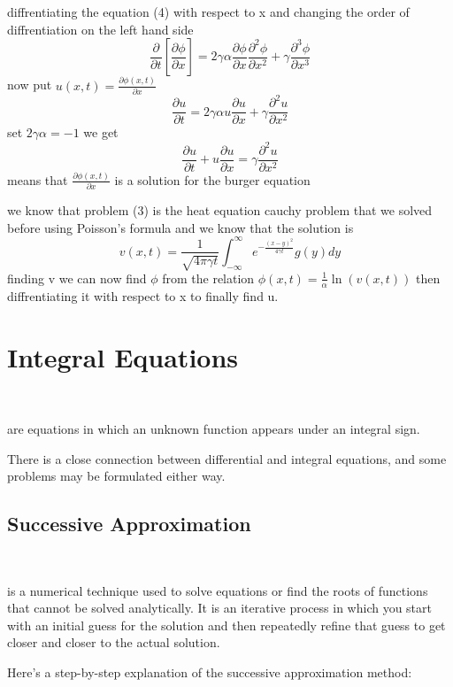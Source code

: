 \documentclass[]{article}
\begin{document}
diffrentiating the equation (4) with respect to x and changing the order of diffrentiation on the left hand side
\[
    \frac{\partial }{\partial t}\left[ \frac{\partial \phi}{\partial x}\right] = 2\gamma\alpha \frac{\partial\phi}{\partial x}\frac{\partial^2 \phi }{\partial x^2} + \gamma\frac{\partial^3 \phi}{\partial x^3}    
\]
now put $\displaystyle u(x,t) = \frac{\partial \phi(x,t)}{\partial x}$
\[
    \frac{\partial u }{\partial t} = 2\gamma\alpha u\frac{\partial u}{\partial x} + \gamma\frac{\partial^2 u}{\partial x^2}    
\]
set $2\gamma\alpha = -1$ we get
\[
    \frac{\partial u }{\partial t} + u\frac{\partial u}{\partial x} = \gamma\frac{\partial^2 u}{\partial x^2}    
\]
means that $\displaystyle \frac{\partial \phi(x,t)}{\partial x}$ is a solution for the burger equation 

we know that problem (3) is the heat equation cauchy problem that we solved before using Poisson's formula and we know that the solution is 
\[
v(x,t) = \frac{1}{\sqrt{4\pi \gamma t}} \int_{-\infty}^{\infty} e^{-\frac{(x-y)^2}{4\gamma t}} g(y)dy    
\]
finding v we can now find $\phi$ from the relation $\displaystyle \phi(x,t) = \frac{1}{\alpha}\ln(v(x,t))$ then diffrentiating it with respect to x to finally find u.

\section{Integral Equations}
\
\begin{definition}
    are equations in which an unknown function appears under an integral sign.
\end{definition}
There is a close connection between differential and integral equations, and some problems may be formulated either way.

\subsection{Successive Approximation}
\
\begin{definition}
    is a numerical technique used to solve equations or find the roots of functions that cannot be solved analytically. It is an iterative process in which you start with an initial guess for the solution and then repeatedly refine that guess to get closer and closer to the actual solution.
\end{definition}

Here's a step-by-step explanation of the successive approximation method:
\end{document}
